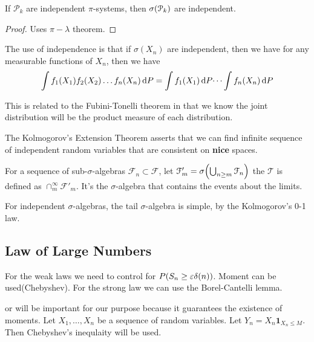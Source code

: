 \begin{thm}
    If \(\mathcal{P}_{k}\) are independent \(\pi\)-systems, then \(\sigma\pqty{\mathcal{P}_{k}}\) are independent. 
\end{thm}

\begin{proof}
    Uses \(\pi- \lambda\) theorem.
\end{proof}



The use of independence is that if \(\sigma(X_{n})\) are independent, then we have for any measurable functions of \(X_{n}\), then we have 
\begin{equation*}
    \int f_{1}\pqty{X_{1}} f_{2}\pqty{X_{2}} \dots f_{n}\pqty{X_{n}} \dd{P} = \int f_{1}\pqty{X_{1}} \dd{P} \dots \int f_{n}\pqty{X_{n}} \dd{P}
\end{equation*}

This is related to the Fubini-Tonelli theorem in that we know the joint distribution will be the product measure of each distribution.

The Kolmogorov's Extension Theorem asserts that we can find infinite sequence of independent random variables that are consistent on \textbf{nice} spaces. 


For a sequence of sub-\(\sigma\)-algebras \(\mathcal{F}_{n} \subset \mathcal{F}\), let \(\mathcal{F}'_{m} = \sigma\pqty{\cup_{n\geq m} \mathcal{F}_{n}}\) the  \(\mathcal{T}\) is defined as \(\cap_{m}^{\infty} \mathcal{F}'_{m}\). It's the \(\sigma\)-algebra that contains the events about the limits. 

For independent \(\sigma\)-algebras, the tail \(\sigma\)-algebra is simple, by the Kolmogorov's 0-1 law. 

\begin{thm}
    
\end{thm}

\subsection{Law of Large Numbers}

For the weak laws we need to control for \(P\pqty{S_{n} \geq \epsilon \delta(n)}\). Moment can be used(Chebyshev). For the strong law we can use the Borel-Cantelli lemma. 


 or  will be important for our purpose because it guarantees the existence of moments. Let \(X_{1},\dots, X_{n}\) be a sequence of random variables. Let \(Y_{n} = X_{n}\mathbf{1}_{X_{n} \leq M}\). Then Chebyshev's inequlaity will be used.

